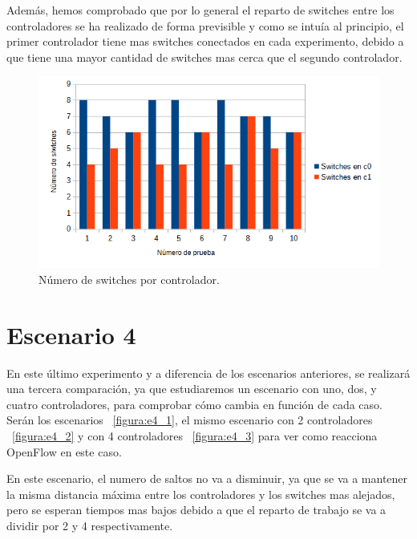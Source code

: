 \documentclass[a4paper, 12pt]{book}
\begin{document}
 	\clearpage
 	Además, hemos comprobado que por lo general el reparto de switches entre los controladores se ha realizado de forma previsible y como se intuía al principio, el primer controlador tiene mas switches conectados en cada experimento, debido a que tiene una mayor cantidad de switches mas cerca que el segundo controlador.
 	
 	
 	\begin{figure}[H]
 		\centering
 		\includegraphics[width=16cm, keepaspectratio]{img/switchesporcontrollerescenario3}
 		\caption{Número de switches por controlador.}
 		\label{figura:switchesporcontrollerb4}
 	\end{figure}
	
	\clearpage
	\section{Escenario 4}
	
	En este último experimento y a diferencia de los escenarios anteriores, se realizará una tercera comparación, ya que estudiaremos un escenario con uno, dos, y cuatro controladores, para comprobar cómo cambia en función de cada caso.
	Serán los escenarios ~\ref{figura:e4_1}, el mismo escenario con 2 controladores ~\ref{figura:e4_2} y con 4 controladores ~\ref{figura:e4_3} para ver como reacciona OpenFlow en este caso.
	
	En este escenario, el numero de saltos no va a disminuir, ya que se va a mantener la misma distancia máxima entre los controladores y los switches mas alejados, pero se esperan tiempos mas bajos debido a que el reparto de trabajo se va a dividir por 2 y 4 respectivamente.
	
\end{document}
